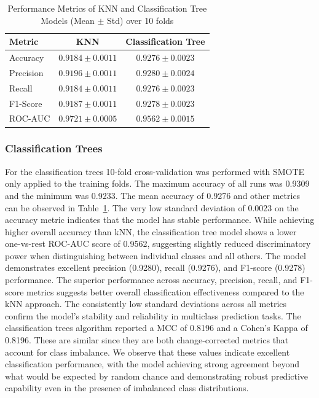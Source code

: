 \documentclass[10pt, conference]{IEEEtran}
\begin{document}
\begin{table}[htbp]
	\centering
	\caption{Performance Metrics of KNN and Classification Tree Models (Mean $\pm$ Std) over 10 folds}
	\label{tab:model_comparison}
	\begin{tabular}{|l|c|c|}
		\hline
		\textbf{Metric} & \textbf{KNN} & \textbf{Classification Tree} \\
		\hline
		Accuracy & $0.9184 \pm 0.0011$ & $0.9276 \pm 0.0023$ \\
		Precision & $0.9196 \pm 0.0011$ & $0.9280 \pm 0.0024$ \\
		Recall & $0.9184 \pm 0.0011$ & $0.9276 \pm 0.0023$ \\
		F1-Score & $0.9187 \pm 0.0011$ & $0.9278 \pm 0.0023$ \\
		ROC-AUC & $0.9721 \pm 0.0005$ & $0.9562 \pm 0.0015$ \\
		\hline
	\end{tabular}
\end{table}



\subsubsection{Classification Trees}
For the classification trees 10-fold cross-validation was performed with SMOTE only applied to the training folds. The maximum accuracy of all runs was 0.9309 and the minimum was 0.9233. The mean accuracy of 0.9276 and other metrics can be observed in Table~\ref{tab:model_comparison}. The very low standard deviation of 0.0023 on the accuracy metric indicates that the model has stable performance. While achieving higher overall accuracy than kNN, the classification tree model shows a lower one-vs-rest ROC-AUC score of 0.9562, suggesting slightly reduced discriminatory power when distinguishing between individual classes and all others. The model demonstrates excellent precision (0.9280), recall (0.9276), and F1-score (0.9278) performance. The superior performance across accuracy, precision, recall, and F1-score metrics suggests better overall classification effectiveness compared to the kNN approach. The consistently low standard deviations across all metrics confirm the model's stability and reliability in multiclass prediction tasks. The classification trees algorithm reported a MCC of 0.8196 and a Cohen's  Kappa of 0.8196. These are similar since they are both change-corrected metrics that account for class imbalance. We observe that these values indicate excellent classification performance, with the model achieving strong agreement beyond what would be expected by random chance and demonstrating robust predictive capability even in the presence of imbalanced class distributions.
\end{document}
